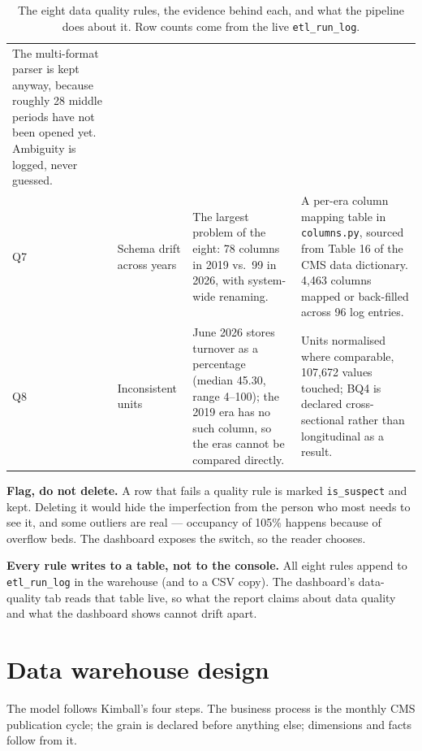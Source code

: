 \documentclass[11pt,a4paper]{article}
\newcommand{\code}[1]{\texttt{#1}}
\begin{document}
\begin{table}[htbp]
\begin{adjustbox}{max width=\linewidth}
\begin{tabular}{L{0.7cm} L{2.9cm} L{7.3cm} L{6.0cm}}
  The multi-format parser is kept anyway, because roughly 28 middle periods
  have not been opened yet. Ambiguity is logged, never guessed. \\
\addlinespace
Q7 & Schema drift across years &
  The largest problem of the eight: 78 columns in 2019 vs.\ 99 in 2026, with
  system-wide renaming. &
  A per-era column mapping table in \code{columns.py}, sourced from Table 16 of
  the CMS data dictionary. 4{,}463 columns mapped or back-filled across 96 log
  entries. \\
\addlinespace
Q8 & Inconsistent units &
  June 2026 stores turnover as a percentage (median 45.30, range 4--100); the
  2019 era has no such column, so the eras cannot be compared directly. &
  Units normalised where comparable, 107{,}672 values touched; BQ4 is declared
  cross-sectional rather than longitudinal as a result. \\
\bottomrule
\end{tabular}
\end{adjustbox}
\caption{The eight data quality rules, the evidence behind each, and what the
pipeline does about it. Row counts come from the live \code{etl\_run\_log}.}
\end{table}

\begin{keybox}[title={Two policies that shaped the whole pipeline}]
\textbf{Flag, do not delete.} A row that fails a quality rule is marked
\code{is\_suspect} and kept. Deleting it would hide the imperfection from the
person who most needs to see it, and some outliers are real — occupancy of
105\% happens because of overflow beds. The dashboard exposes the switch, so
the reader chooses.

\vspace{0.3em}
\textbf{Every rule writes to a table, not to the console.} All eight rules
append to \code{etl\_run\_log} in the warehouse (and to a CSV copy). The
dashboard's data-quality tab reads that table live, so what the report claims
about data quality and what the dashboard shows cannot drift apart.
\end{keybox}

\section{Data warehouse design}

The model follows Kimball's four steps. The business process is the monthly
CMS publication cycle; the grain is declared before anything else; dimensions
and facts follow from it.
\end{document}
